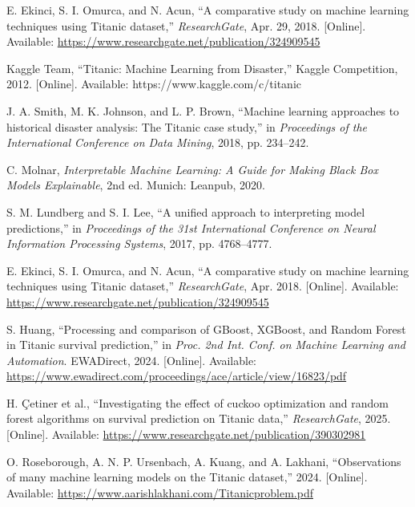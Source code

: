 \documentclass[conference]{IEEEtran}
\begin{document}
\begin{thebibliography}{00}

E. Ekinci, S. I. Omurca, and N. Acun, ``A comparative study on machine learning techniques using Titanic dataset,'' \textit{ResearchGate}, Apr. 29, 2018. [Online]. Available: \url{https://www.researchgate.net/publication/324909545}

 Kaggle Team, ``Titanic: Machine Learning from Disaster,'' Kaggle Competition, 2012. [Online]. Available: https://www.kaggle.com/c/titanic

 J. A. Smith, M. K. Johnson, and L. P. Brown, ``Machine learning approaches to historical disaster analysis: The Titanic case study,'' in \textit{Proceedings of the International Conference on Data Mining}, 2018, pp. 234--242.

 C. Molnar, \textit{Interpretable Machine Learning: A Guide for Making Black Box Models Explainable}, 2nd ed. Munich: Leanpub, 2020.

 S. M. Lundberg and S. I. Lee, ``A unified approach to interpreting model predictions,'' in \textit{Proceedings of the 31st International Conference on Neural Information Processing Systems}, 2017, pp. 4768--4777.

 E. Ekinci, S. I. Omurca, and N. Acun, ``A comparative study on machine learning techniques using Titanic dataset,'' \textit{ResearchGate}, Apr. 2018. [Online]. Available: \url{https://www.researchgate.net/publication/324909545}

 S. Huang, ``Processing and comparison of GBoost, XGBoost, and Random Forest in Titanic survival prediction,'' in \textit{Proc. 2nd Int. Conf. on Machine Learning and Automation}. EWADirect, 2024. [Online]. Available: \url{https://www.ewadirect.com/proceedings/ace/article/view/16823/pdf}

 H. Çetiner et al., ``Investigating the effect of cuckoo optimization and random forest algorithms on survival prediction on Titanic data,'' \textit{ResearchGate}, 2025. [Online]. Available: \url{https://www.researchgate.net/publication/390302981}

 O. Roseborough, A. N. P. Ursenbach, A. Kuang, and A. Lakhani, ``Observations of many machine learning models on the Titanic dataset,'' 2024. [Online]. Available: \url{https://www.aarishlakhani.com/Titanicproblem.pdf}


\end{thebibliography}
\end{document}
